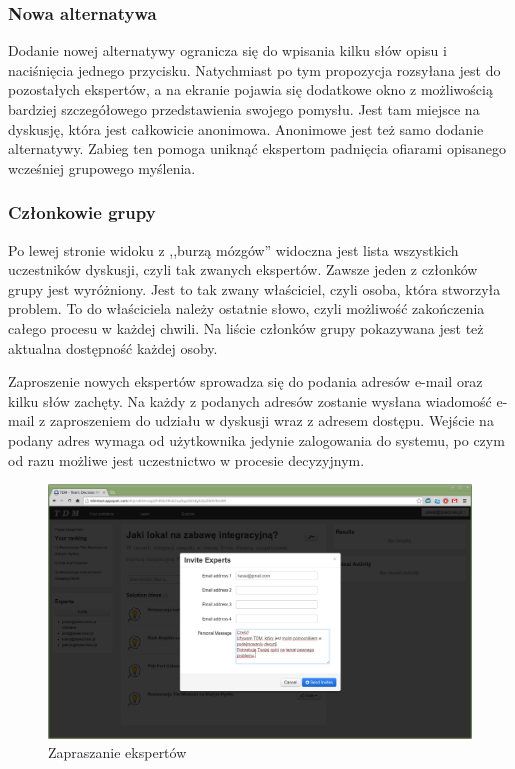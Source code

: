 \subsubsection{Nowa alternatywa}
Dodanie nowej alternatywy ogranicza się do wpisania kilku słów opisu i
naciśnięcia jednego przycisku. Natychmiast po tym propozycja rozsyłana jest do
pozostałych ekspertów, a na ekranie pojawia się dodatkowe okno z możliwością
bardziej szczegółowego przedstawienia swojego pomysłu. Jest tam miejsce na
dyskusję, która jest całkowicie anonimowa. Anonimowe jest też samo dodanie
alternatywy. Zabieg ten pomoga uniknąć ekspertom padnięcia ofiarami opisanego
wcześniej grupowego myślenia.

\subsubsection{Członkowie grupy}
Po lewej stronie widoku z ,,burzą mózgów'' widoczna jest lista wszystkich
uczestników dyskusji, czyli tak zwanych ekspertów. Zawsze jeden z członków grupy
jest wyróżniony. Jest to tak zwany właściciel, czyli osoba, która stworzyła
problem. To do właściciela należy ostatnie słowo, czyli możliwość zakończenia
całego procesu w każdej chwili. Na liście członków grupy pokazywana jest też
aktualna dostępność każdej osoby.

Zaproszenie nowych ekspertów sprowadza się do podania adresów e-mail oraz kilku
słów zachęty. Na każdy z podanych adresów zostanie wysłana wiadomość e-mail z
zaproszeniem do udziału w dyskusji wraz z adresem dostępu. Wejście na podany
adres wymaga od użytkownika jedynie zalogowania do systemu, po czym od razu
możliwe jest uczestnictwo w procesie decyzyjnym.
\begin{figure}[!htbp]
  \includegraphics[width=\linewidth]
    {chapters/prototyp/tdm_invitation}
  \caption{Zapraszanie ekspertów}
  \label{fig:invitation}
\end{figure}

